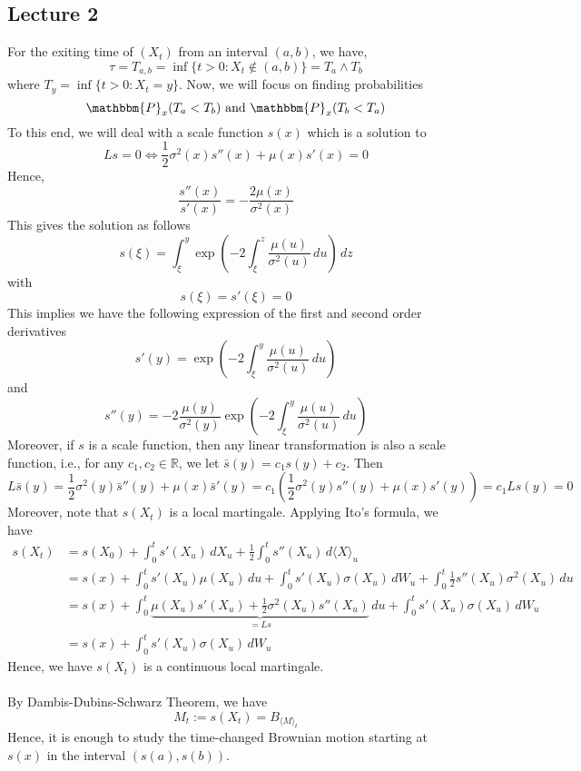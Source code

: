\documentclass[12pt,a4paper]{article}
\newcommand{\R}{\mathbb{R}}
\begin{document}
    \subsection{Lecture 2}
    For the exiting time of $(X_t)$ from an interval $(a,b)$, we have,
    $$
    \tau = T_{a,b} = \inf\{t>0: X_t\not\in(a,b)\} = T_a\wedge T_b
    $$
    where $T_y = \inf\{t>0: X_t=y\}$. Now, we will focus on finding probabilities 
    $$
    \mathbbm{P}_x(T_a<T_b)\text{ and } \mathbbm{P}_x(T_b<T_a)
    $$
    To this end, we will deal with a scale function $s(x)$ which is a solution to
    $$
    Ls=0\iff \frac{1}{2}\sigma^2(x)s''(x) + \mu(x)s'(x) = 0
    $$
    Hence,
    $$
    \frac{s''(x)}{s'(x)} = -\frac{2\mu(x)}{\sigma^2(x)}
    $$
    This gives the solution as follows
    $$
    s(\xi ) = \int_\xi^y \exp\left(-2\int_\xi^z \frac{\mu(u)}{\sigma^2(u)}\, du\right)\, dz
    $$
    with
    $$
    s(\xi) = s'(\xi) = 0
    $$
    This implies we have the following expression of the first and second order derivatives
    $$
    s'(y) = \exp\left(-2\int_\xi^y \frac{\mu(u)}{\sigma^2(u)}\, du\right)
    $$
    and
    $$
    s''(y) = -2\frac{\mu(y)}{\sigma^2(y)}\exp\left(-2\int_\xi^y \frac{\mu(u)}{\sigma^2(u)}\, du\right)
    $$
    Moreover, if $s$ is a scale function,  then any linear transformation is also a scale function, i.e., for any $c_1,c_2\in\R$, we let $\bar s(y) = c_1 s(y)+c_2$. Then
    $$
    L\bar s(y)= \frac{1}{2}\sigma^2(y)\bar s''(y) + \mu(x)\bar s'(y) = c_1\left( \frac{1}{2}\sigma^2(y) s''(y) + \mu(x)s'(y)\right) = c_1Ls(y)=0
    $$
    Moreover, note that $s(X_t)$ is a local martingale. Applying Ito's formula, we have
    \begin{align*}
        s(X_t) & = s(X_0) + \int_0^t s'(X_u)\, dX_u + \frac{1}{2}\int_0^t s''(X_u)\,d\langle X\rangle_u\\
        &= s(x) + \int_0^t s'(X_u)\mu(X_u)\, du + \int_0^t s'(X_u)\sigma(X_u)\,dW_u + \int_0^t \frac{1}{2}s''(X_u)\sigma^2(X_u)\, du\\
        &= s(x) + \int_0^t \underbrace{\mu(X_u)s'(X_u) +\frac{1}{2}\sigma^2(X_u)s''(X_u)}_{=Ls}\, du + \int_0^t s'(X_u)\sigma(X_u)\, dW_u\\
        &= s(x) + \int_0^t s'(X_u)\sigma(X_u)\, dW_u
    \end{align*}
    Hence, we have $s(X_t)$ is a continuous local martingale.\\
    \\
    By Dambis-Dubins-Schwarz Theorem, we have
    $$
    M_t:= s(X_t) = B_{\langle M\rangle_t}
    $$
    Hence, it is enough to study the time-changed Brownian motion starting at $s(x)$ in the interval $(s(a), s(b))$.
\end{document}

